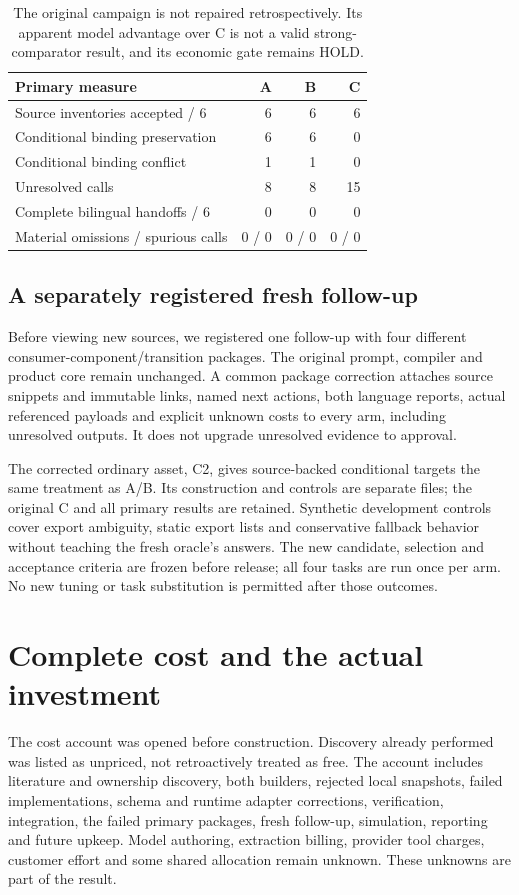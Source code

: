 \documentclass[11pt,a4paper]{article}
\begin{document}
\begin{table}[htbp]
\centering\small
\begin{tabularx}{\textwidth}{Xrrr}
\toprule
Primary measure & A & B & C\\
\midrule
Source inventories accepted / 6 & 6 & 6 & 6\\
Conditional binding preservation & 6 & 6 & 0\\
Conditional binding conflict & 1 & 1 & 0\\
Unresolved calls & 8 & 8 & 15\\
Complete bilingual handoffs / 6 & 0 & 0 & 0\\
Material omissions / spurious calls & 0 / 0 & 0 / 0 & 0 / 0\\
\bottomrule
\end{tabularx}
\caption{The original campaign is not repaired retrospectively. Its apparent model advantage over C is not a valid strong-comparator result, and its economic gate remains HOLD.}
\end{table}

\subsection{A separately registered fresh follow-up}
Before viewing new sources, we registered one follow-up with four different consumer-component/transition packages. The original prompt, compiler and product core remain unchanged. A common package correction attaches source snippets and immutable links, named next actions, both language reports, actual referenced payloads and explicit unknown costs to every arm, including unresolved outputs. It does not upgrade unresolved evidence to approval.

The corrected ordinary asset, C2, gives source-backed conditional targets the same treatment as A/B. Its construction and controls are separate files; the original C and all primary results are retained. Synthetic development controls cover export ambiguity, static export lists and conservative fallback behavior without teaching the fresh oracle's answers. The new candidate, selection and acceptance criteria are frozen before release; all four tasks are run once per arm. No new tuning or task substitution is permitted after those outcomes.



\section{Complete cost and the actual investment}
The cost account was opened before construction. Discovery already performed was listed as unpriced, not retroactively treated as free. The account includes literature and ownership discovery, both builders, rejected local snapshots, failed implementations, schema and runtime adapter corrections, verification, integration, the failed primary packages, fresh follow-up, simulation, reporting and future upkeep. Model authoring, extraction billing, provider tool charges, customer effort and some shared allocation remain unknown. These unknowns are part of the result.
\end{document}
